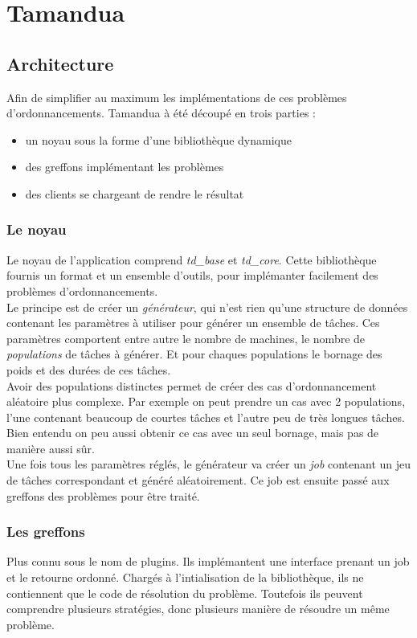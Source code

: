\chapter{Tamandua}
\section{Architecture}
Afin de simplifier au maximum les implémentations de ces problèmes 
d'ordonnancements. Tamandua à été découpé en trois parties :
\begin{itemize}
   \item un noyau sous la forme d'une bibliothèque dynamique
   \item des greffons implémentant les problèmes
   \item des clients se chargeant de rendre le résultat
\end{itemize}

\subsection{Le noyau}
Le noyau de l'application comprend {\em td\_base} et {\em td\_core}. Cette
bibliothèque fournis un format et un ensemble d'outils, pour implémanter
facilement des problèmes d'ordonnancements. \\
Le principe est de créer un {\em générateur}, qui n'est rien qu'une structure de
données contenant les paramètres à utiliser pour générer un ensemble de tâches.
Ces paramètres comportent entre autre le nombre de machines, le nombre de
{\em populations} de tâches à générer. Et pour chaques populations le bornage 
des poids et des durées de ces tâches.\\
Avoir des populations distinctes permet de créer des cas d'ordonnancement
aléatoire plus complexe. Par exemple on peut prendre un cas avec 2 populations, 
l'une contenant beaucoup de courtes tâches et l'autre peu de très longues 
tâches. Bien entendu on peu aussi obtenir ce cas avec un seul bornage, mais pas 
de manière aussi sûr.\\
Une fois tous les paramètres réglés, le générateur va créer un {\em job}
contenant un jeu de tâches correspondant et généré aléatoirement. Ce job est
ensuite passé aux greffons des problèmes pour être traité.

\subsection{Les greffons}
Plus connu sous le nom de plugins. Ils implémantent une interface prenant un job
et le retourne ordonné. Chargés à l'intialisation de la bibliothèque, ils
ne contiennent que le code de résolution du problème. Toutefois ils peuvent
comprendre plusieurs stratégies, donc plusieurs manière de résoudre un même
problème. 


